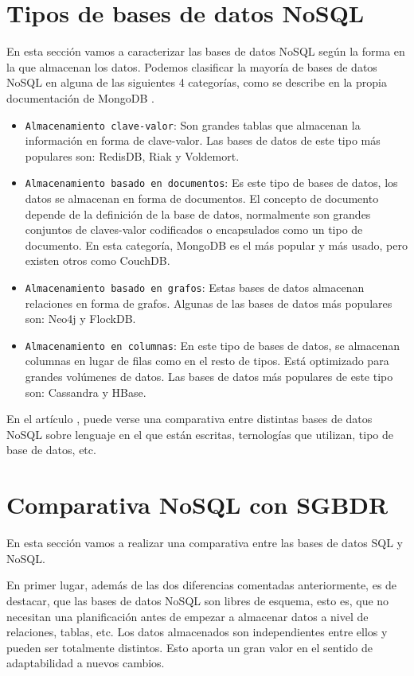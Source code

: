 \section{Tipos de bases de datos NoSQL}

En esta sección vamos a caracterizar las bases de datos NoSQL según la forma en la que almacenan los datos. Podemos clasificar la mayoría de bases de datos NoSQL en alguna de las siguientes 4 categorías, como se describe en la propia documentación de MongoDB \cite{mongoclassification}.

\begin{itemize}
    \item \texttt{Almacenamiento clave-valor}: Son grandes tablas que almacenan la información en forma de clave-valor. Las bases de datos de este tipo más populares son: RedisDB, Riak y Voldemort.
    \item \texttt{Almacenamiento basado en documentos}: Es este tipo de bases de datos, los datos se almacenan en forma de documentos. El concepto de documento depende de la definición de la base de datos, normalmente son grandes conjuntos de claves-valor codificados o encapsulados como un tipo de documento. En esta categoría, MongoDB es el más popular y más usado, pero existen otros como CouchDB.
    \item \texttt{Almacenamiento basado en grafos}: Estas bases de datos almacenan relaciones en forma de grafos. Algunas de las bases de datos más populares son: Neo4j y FlockDB.
    \item \texttt{Almacenamiento en columnas}: En este tipo de bases de datos, se almacenan columnas en lugar de filas como en el resto de tipos. Está optimizado para grandes volúmenes de datos. Las bases de datos más populares de este tipo son: Cassandra y HBase.
\end{itemize}

En el artículo \cite{nosqlcomparativas}, puede verse una comparativa entre distintas bases de datos NoSQL sobre lenguaje en el que están escritas, ternologías que utilizan, tipo de base de datos, etc.

\section{Comparativa NoSQL con SGBDR}

En esta sección vamos a realizar una comparativa entre las bases de datos SQL y NoSQL.

En primer lugar, además de las dos diferencias comentadas anteriormente, es de destacar, que las bases de datos NoSQL son libres de esquema, esto es, que no necesitan una planificación antes de empezar a almacenar datos a nivel de relaciones, tablas, etc. Los datos almacenados son independientes entre ellos y pueden ser totalmente distintos. Esto aporta un gran valor en el sentido de adaptabilidad a nuevos cambios.

